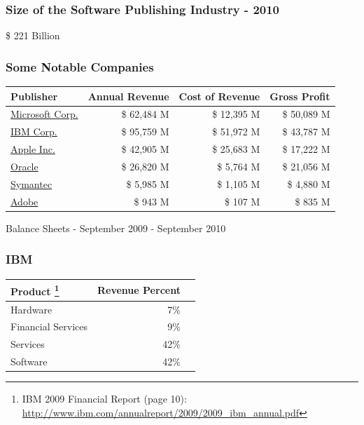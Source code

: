 \documentclass[18pt]{beamer}
\begin{document}
\begin{frame}
\frametitle{Size of the Software Publishing Industry - 2010}
\fontsize{72pt}{90pt}\selectfont
\begin{center}
\$ 221 Billion
\end{center}
\end{frame}


\begin{frame}
\frametitle{Some Notable Companies}
\begin{tabular}{lrrr}
\hline
\textbf{Publisher} &	\textbf{Annual Revenue} & \textbf{Cost of Revenue} & \textbf{Gross Profit} \\
\hline
\hline
\href{http://www.google.com/finance?fstype=ii\&q=NASDAQ:MSFT}{Microsoft Corp.}	& \$ 62,484 M & \$ 12,395 M  & \$ 50,089 M  \\
\hline
\href{http://www.google.com/finance?q=NYSE:IBM\&fstype=ii}{IBM Corp.} & \$ 95,759 M & \$ 51,972 M & \$ 43,787 M \\
\hline
\href{http://www.google.com/finance?q=NASDAQ:AAPL\&fstype=ii}{Apple Inc.} & \$ 42,905 M & \$ 25,683 M & \$ 17,222 M \\
\hline
\href{http://www.google.com/finance?q=NASDAQ:ORCL\&fstype=ii}{Oracle} & \$ 26,820 M & \$ 5,764 M & \$ 21,056 M \\
\hline
\href{http://www.google.com/finance?q=NASDAQ:SYMC\&fstype=ii}{Symantec}	&	\$ 5,985 M & \$ 1,105 M & \$ 4,880 M \\
\hline
\href{http://www.google.com/finance?q=NASDAQ:ADBE\&fstype=ii}{Adobe} & \$ 943 M & \$ 107 M & \$ 835 M \\
\hline
\end{tabular}
\bigskip
\begin{center}
Balance Sheets - September 2009 - September 2010
\end{center}
\end{frame}

{
\begin{frame}
\frametitle{IBM}
\begin{center}
\begin{tabular}{lrr}
\hline
\textbf{Product}
\footnote{IBM 2009 Financial Report (page 10):
\url{http://www.ibm.com/annualreport/2009/2009_ibm_annual.pdf}}
& \textbf{Revenue Percent} \\
\hline
\hline
Hardware & 7\% \\
Financial Services & 9\% \\
Services & 42\% \\
Software & 42\%\\
\hline
\end{tabular}
\end{center}
\end{frame}
}
\end{document}
